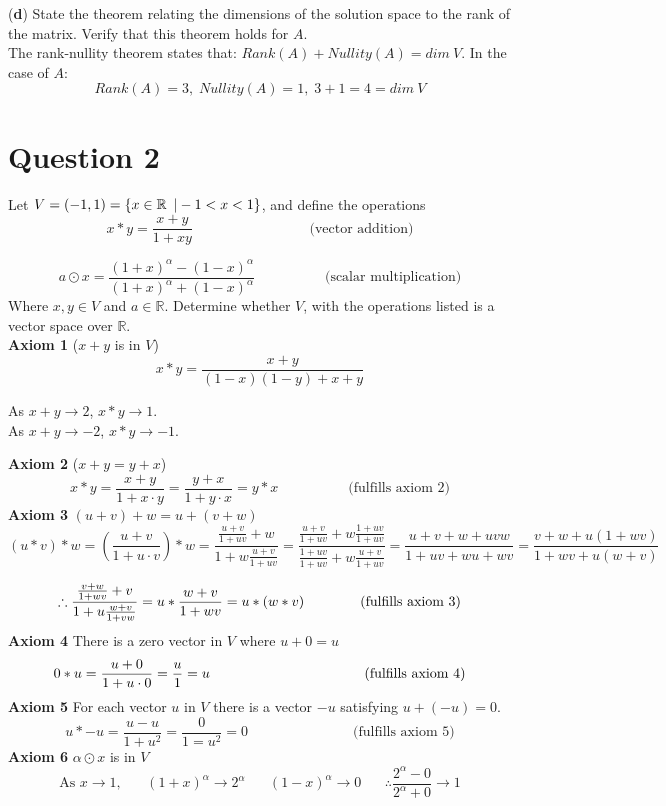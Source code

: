 \documentclass[12pt]{article}
\begin{document}
\newpage
(\textbf{d}) State the theorem relating the dimensions of the solution space to the rank of the matrix. Verify that this theorem holds for $A$.\\
\medskip
The rank-nullity theorem states that: $Rank(A)+Nullity(A)=dim\:V$. In the case of $A$:
$$
Rank(A)=3,\;Nullity(A)=1,\;3+1=4=dim\:V
$$

\section*{Question 2}

Let $V=(-1,1)=\{x \in \mathbb{R}\hspace{5px}| -1 < x < 1 \}$, and define the operations \\
$$
x \ast y = \frac{x+y}{1+xy}
\hspace{100pt}
\text{(vector addition)}
$$ 

$$
a \odot x = \frac{(1+x)^{\alpha} - (1-x)^{\alpha}}{(1+x)^{\alpha} + (1-x)^{\alpha}}
\hspace{60pt}
\text{(scalar multiplication)}
$$
Where $x,y \in V$ and $a \in \mathbb{R}$. Determine whether $V$, with the operations listed is a vector space over $\mathbb{R}$.\\
\medskip
\textbf{Axiom 1} ($x+y$ is in $V$)
$$
x\ast y=\frac{x+y}{(1-x)(1-y) + x + y}
$$
\begin{center}
As $x+y \to 2$, $x\ast y \to 1$.\\
As $x+y \to -2$, $x\ast y \to -1$.\\
\end{center}
\medskip
\textbf{Axiom 2} ($x+y = y+x$)
$$
x\ast y=\frac{x+y}{1+x\cdot y}=\frac{y+x}{1+y\cdot x}=y\ast x
\hspace{60pt}
\text{(fulfills axiom 2)}
$$
\medskip
\textbf{Axiom 3} $(u+v)+w = u+(v+w)$
$$
(u \ast v) \ast w = \left(\frac{u + v}{1 + u \cdot v}\right)\ast w 
= \frac{\frac{u+v}{1+ uv} + w}{1 + w\frac{u+v}{1+ uv}}
= \frac{\frac{u+v}{1+uv} + w\frac{1+uv}{1+uv}}{\frac{1+uv}{1+uv} + w \frac{u+v}{1+uv}}
= \frac{u+v+w+uvw}{1+uv+wu+wv}
= \frac{v+w+u(1+wv)}{1+wv+u(w+v)}
$$

$$
\therefore
\frac{\frac{v+w}{1+wv} + v}{1+u\frac{w+v}{1+vw}}=u\ast \frac{w+v}{1+wv}
=u\ast (w \ast v)
\hspace{40px}
\text{(fulfills axiom 3)}
$$
\textbf{Axiom 4} There is a zero vector in $V$ where $u+0=u$
$$
0 \ast u = \frac{u+0}{1 + u\cdot 0}= \frac{u}{1}= u
\hspace{110px}
\text{(fulfills axiom 4)}
$$
\textbf{Axiom 5} For each vector $u$ in $V$ there is a vector $-u$ satisfying $u+(-u)=0$.
$$
u\ast-u=\frac{u-u}{1+u^2}=\frac{0}{1=u^2}=0
\hspace{90pt}
\text{(fulfills axiom 5)}
$$
\textbf{Axiom 6} $\alpha\odot x$ is in $V$
$$\text{As } x \to 1,
\hspace{20pt} (1+x)^\alpha\to2^\alpha
\hspace{20pt} (1-x)^\alpha\to0
\hspace{20pt} \therefore
\frac{2^\alpha-0}{2^\alpha + 0}\to1
$$
\end{document}
